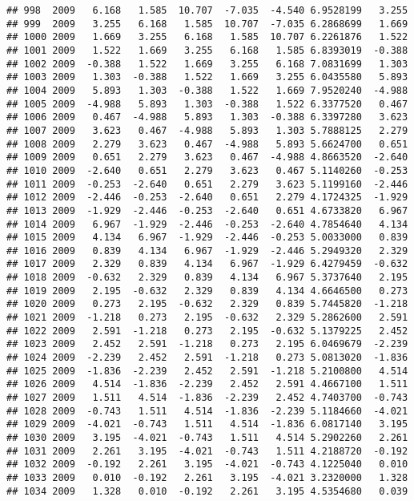 \documentclass[]{article}
\begin{document}
\begin{verbatim}
## 998  2009   6.168   1.585  10.707  -7.035  -4.540 6.9528199   3.255
## 999  2009   3.255   6.168   1.585  10.707  -7.035 6.2868699   1.669
## 1000 2009   1.669   3.255   6.168   1.585  10.707 6.2261876   1.522
## 1001 2009   1.522   1.669   3.255   6.168   1.585 6.8393019  -0.388
## 1002 2009  -0.388   1.522   1.669   3.255   6.168 7.0831699   1.303
## 1003 2009   1.303  -0.388   1.522   1.669   3.255 6.0435580   5.893
## 1004 2009   5.893   1.303  -0.388   1.522   1.669 7.9520240  -4.988
## 1005 2009  -4.988   5.893   1.303  -0.388   1.522 6.3377520   0.467
## 1006 2009   0.467  -4.988   5.893   1.303  -0.388 6.3397280   3.623
## 1007 2009   3.623   0.467  -4.988   5.893   1.303 5.7888125   2.279
## 1008 2009   2.279   3.623   0.467  -4.988   5.893 5.6624700   0.651
## 1009 2009   0.651   2.279   3.623   0.467  -4.988 4.8663520  -2.640
## 1010 2009  -2.640   0.651   2.279   3.623   0.467 5.1140260  -0.253
## 1011 2009  -0.253  -2.640   0.651   2.279   3.623 5.1199160  -2.446
## 1012 2009  -2.446  -0.253  -2.640   0.651   2.279 4.1724325  -1.929
## 1013 2009  -1.929  -2.446  -0.253  -2.640   0.651 4.6733820   6.967
## 1014 2009   6.967  -1.929  -2.446  -0.253  -2.640 4.7854640   4.134
## 1015 2009   4.134   6.967  -1.929  -2.446  -0.253 5.0033000   0.839
## 1016 2009   0.839   4.134   6.967  -1.929  -2.446 5.2949320   2.329
## 1017 2009   2.329   0.839   4.134   6.967  -1.929 6.4279459  -0.632
## 1018 2009  -0.632   2.329   0.839   4.134   6.967 5.3737640   2.195
## 1019 2009   2.195  -0.632   2.329   0.839   4.134 4.6646500   0.273
## 1020 2009   0.273   2.195  -0.632   2.329   0.839 5.7445820  -1.218
## 1021 2009  -1.218   0.273   2.195  -0.632   2.329 5.2862600   2.591
## 1022 2009   2.591  -1.218   0.273   2.195  -0.632 5.1379225   2.452
## 1023 2009   2.452   2.591  -1.218   0.273   2.195 6.0469679  -2.239
## 1024 2009  -2.239   2.452   2.591  -1.218   0.273 5.0813020  -1.836
## 1025 2009  -1.836  -2.239   2.452   2.591  -1.218 5.2100800   4.514
## 1026 2009   4.514  -1.836  -2.239   2.452   2.591 4.4667100   1.511
## 1027 2009   1.511   4.514  -1.836  -2.239   2.452 4.7403700  -0.743
## 1028 2009  -0.743   1.511   4.514  -1.836  -2.239 5.1184660  -4.021
## 1029 2009  -4.021  -0.743   1.511   4.514  -1.836 6.0817140   3.195
## 1030 2009   3.195  -4.021  -0.743   1.511   4.514 5.2902260   2.261
## 1031 2009   2.261   3.195  -4.021  -0.743   1.511 4.2188720  -0.192
## 1032 2009  -0.192   2.261   3.195  -4.021  -0.743 4.1225040   0.010
## 1033 2009   0.010  -0.192   2.261   3.195  -4.021 3.2320000   1.328
## 1034 2009   1.328   0.010  -0.192   2.261   3.195 4.5354680   0.039

\end{verbatim}
\end{document}
